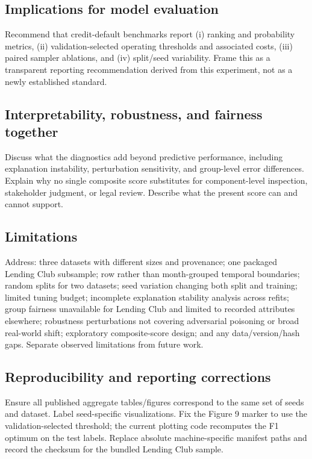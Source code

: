 \documentclass[pdflatex,sn-mathphys-num]{sn-jnl}
\begin{document}
\subsection{Implications for model evaluation}
Recommend that credit-default benchmarks report (i) ranking and probability metrics, (ii) validation-selected operating thresholds and associated costs, (iii) paired sampler ablations, and (iv) split/seed variability. Frame this as a transparent reporting recommendation derived from this experiment, not as a newly established standard.

\subsection{Interpretability, robustness, and fairness together}
Discuss what the diagnostics add beyond predictive performance, including explanation instability, perturbation sensitivity, and group-level error differences. Explain why no single composite score substitutes for component-level inspection, stakeholder judgment, or legal review. Describe what the present score can and cannot support.

\subsection{Limitations}
Address: three datasets with different sizes and provenance; one packaged Lending Club subsample; row rather than month-grouped temporal boundaries; random splits for two datasets; seed variation changing both split and training; limited tuning budget; incomplete explanation stability analysis across refits; group fairness unavailable for Lending Club and limited to recorded attributes elsewhere; robustness perturbations not covering adversarial poisoning or broad real-world shift; exploratory composite-score design; and any data/version/hash gaps. Separate observed limitations from future work.

\subsection{Reproducibility and reporting corrections}
Ensure all published aggregate tables/figures correspond to the same set of seeds and dataset. Label seed-specific visualizations. Fix the Figure 9 marker to use the validation-selected threshold; the current plotting code recomputes the F1 optimum on the test labels. Replace absolute machine-specific manifest paths and record the checksum for the bundled Lending Club sample.
\end{document}
